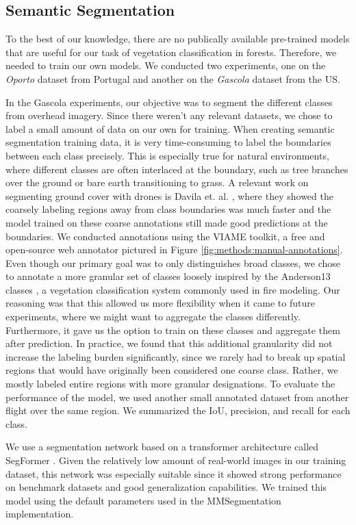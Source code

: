 \subsection{Semantic Segmentation}
To the best of our knowledge, there are no publically available pre-trained models that are useful for our task of vegetation classification in forests. Therefore, we needed to train our own models. We conducted two experiments, one on the \textit{Oporto} dataset from Portugal and another on the \textit{Gascola} dataset from the US. 

In the Gascola experiments, our objective was to segment the different classes from overhead imagery. Since there weren't any relevant datasets, we chose to label a small amount of data on our own for training. When creating semantic segmentation training data, it is very time-consuming to label the boundaries between each class precisely. This is especially true for natural environments, where different classes are often interlaced at the boundary, such as tree branches over the ground or bare earth transitioning to grass. A relevant work on segmenting ground cover with drones is Davila et. al. \cite{Davila2022ADAPT:AI}, where they showed the coarsely labeling regions away from class boundaries was much faster and the model trained on these coarse annotations still made good predictions at the boundaries. We conducted annotations using the VIAME toolkit, a free and open-source web annotator pictured in Figure \ref{fig:methods:manual-annotations}. Even though our primary goal was to only distinguishes broad classes, we chose to annotate a more granular set of classes loosely inspired by the Anderson13 classes \cite{anderson1981aids}, a vegetation classification system commonly used in fire modeling. Our reasoning was that this allowed us more flexibility when it came to future experiments, where we might want to aggregate the classes differently. Furthermore, it gave us the option to train on these classes and aggregate them after prediction. In practice, we found that this additional granularity did not increase the labeling burden significantly, since we rarely had to break up spatial regions that would have originally been considered one coarse class. Rather, we mostly labeled entire regions with more granular designations. 
To evaluate the performance of the model, we used another small annotated dataset from another flight over the same region. We summarized the IoU, precision, and recall for each class.

We use a segmentation network based on a transformer architecture called SegFormer \cite{Xie2021}. Given the relatively low amount of real-world images in our training dataset, this network was especially suitable since it showed strong performance on benchmark datasets and good generalization capabilities. We trained this model using the default parameters used in the MMSegmentation \cite{mmseg2020} implementation. 

